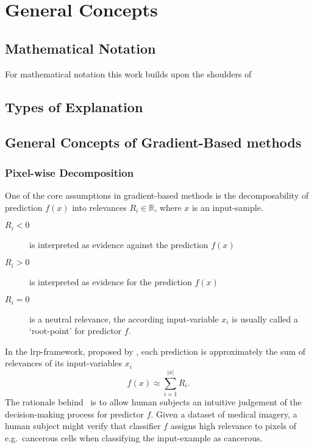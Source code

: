 \section{General Concepts}

\subsection{Mathematical Notation}
For mathematical notation this work builds upon the shoulders of~\cite{Kindermans.2018}

\subsection{Types of Explanation}
\subsection{General Concepts of Gradient-Based methods}
\subsubsection{Pixel-wise Decomposition}\label{subsubsect:pixel-wise-decomp}
One of the core assumptions in gradient-based methods is the decomposability of prediction \(f(x)\) into relevances \(R_i \in \mathbb R\), where \(x\) is an input-sample. 
\begin{description}
    \item[\(R_i < 0\)] is interpreted as evidence against the prediction \(f(x)\)
    \item[\(R_i > 0\)] is interpreted as evidence for the prediction \(f(x)\)
    \item[\(R_i = 0\)] is a neutral relevance, the according input-variable \(x_i\) is usually called a `root-point' for predictor \(f\).
\end{description}
In the \gls{lrp}-framework, proposed by , each prediction is approximately the sum of relevances of its input-variables \(x_i\)
\begin{equation}
    f(x) \approx \sum_{i=1}^{|x|} R_i.\label{eq:1}
\end{equation}
The rationale behind~ is to allow human subjects an intuitive judgement of the decision-making process for predictor \(f\). Given a dataset of medical imagery, a human subject might verify that classifier \(f\) assigns high relevance to pixels of e.g.\ cancerous cells when classifying the input-example as cancerous.

